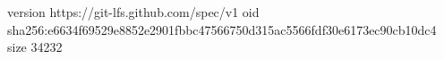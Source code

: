 version https://git-lfs.github.com/spec/v1
oid sha256:e6634f69529e8852e2901fbbc47566750d315ac5566fdf30e6173ec90cb10dc4
size 34232
